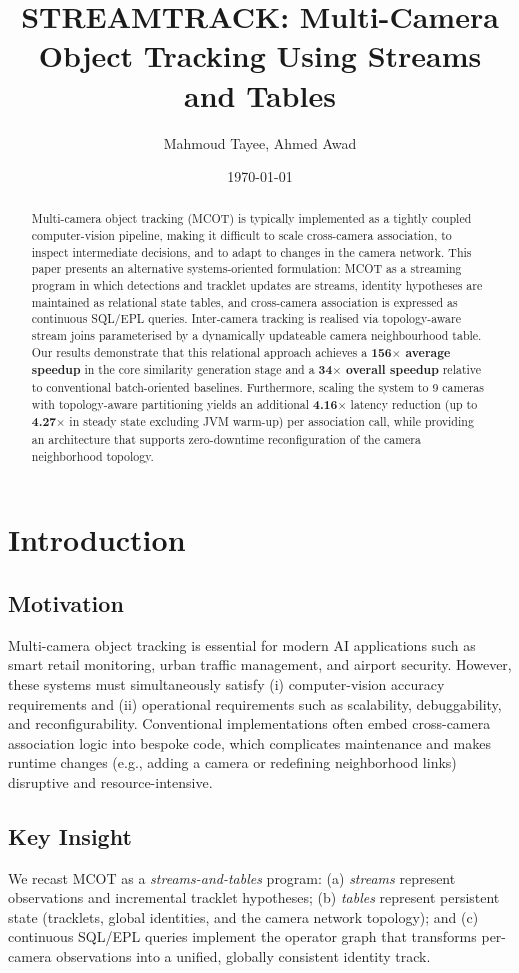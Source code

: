 \documentclass[11pt]{article}
\title{STREAMTRACK: Multi-Camera Object Tracking Using Streams and Tables}
\author{Mahmoud Tayee, Ahmed Awad}
\date{\today}
\begin{document}
\maketitle

\begin{abstract}
Multi-camera object tracking (MCOT) is typically implemented as a tightly coupled computer-vision pipeline, making it difficult to scale cross-camera association, to inspect intermediate decisions, and to adapt to changes in the camera network. This paper presents an alternative systems-oriented formulation: MCOT as a streaming program in which detections and tracklet updates are streams, identity hypotheses are maintained as relational state tables, and cross-camera association is expressed as continuous SQL/EPL queries. Inter-camera tracking is realised via topology-aware stream joins parameterised by a dynamically updateable camera neighbourhood table. Our results demonstrate that this relational approach achieves a \textbf{156$\times$ average speedup} in the core similarity generation stage and a \textbf{34$\times$ overall speedup} relative to conventional batch-oriented baselines. Furthermore, scaling the system to 9 cameras with topology-aware partitioning yields an additional \textbf{4.16$\times$} latency reduction (up to \textbf{4.27$\times$} in steady state excluding JVM warm-up) per association call, while providing an architecture that supports zero-downtime reconfiguration of the camera neighborhood topology.
\end{abstract}

\section{Introduction}
\subsection{Motivation}
Multi-camera object tracking is essential for modern AI applications such as smart retail monitoring, urban traffic management, and airport security. However, these systems must simultaneously satisfy (i) computer-vision accuracy requirements and (ii) operational requirements such as scalability, debuggability, and reconfigurability. Conventional implementations often embed cross-camera association logic into bespoke code, which complicates maintenance and makes runtime changes (e.g., adding a camera or redefining neighborhood links) disruptive and resource-intensive.

\subsection{Key Insight}
We recast MCOT as a \emph{streams-and-tables} program: (a) \emph{streams} represent observations and incremental tracklet hypotheses; (b) \emph{tables} represent persistent state (tracklets, global identities, and the camera network topology); and (c) continuous SQL/EPL queries implement the operator graph that transforms per-camera observations into a unified, globally consistent identity track.
\end{document}
